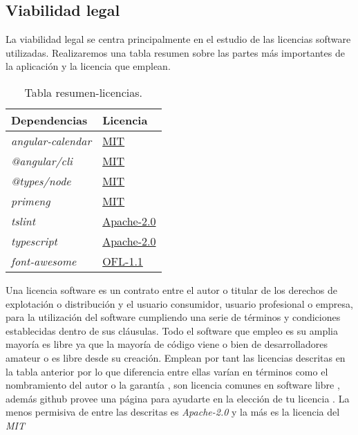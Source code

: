 \subsection{Viabilidad legal}\label{viabilidad-legal}
La viabilidad legal se centra principalmente en el estudio de las licencias software utilizadas. Realizaremos una tabla resumen sobre las partes más importantes de la aplicación y la licencia que emplean.

\begin{table}[htbp]
\begin{center}
\begin{tabular}{|l|l|}
\hline
Dependencias & Licencia \\
\hline \hline
\emph{angular-calendar} & \hyperlink{https://opensource.org/licenses/MIT}{MIT}\\ \hline
\emph{@angular/cli} & \hyperlink{https://opensource.org/licenses/MIT}{MIT}\\ \hline
\emph{@types/node} & \hyperlink{https://opensource.org/licenses/MIT}{MIT}\\ \hline
\emph{primeng} & \hyperlink{https://opensource.org/licenses/MIT}{MIT}\\ \hline
\emph{tslint} & \hyperlink{https://opensource.org/licenses/Apache-2.0}{Apache-2.0}\\ \hline
\emph{typescript} & \hyperlink{https://opensource.org/licenses/Apache-2.0}{Apache-2.0}\\ \hline
\emph{font-awesome} & \hyperlink{https://opensource.org/licenses/OFL-1.1}{OFL-1.1}\\ \hline

\end{tabular}
\caption{Tabla resumen-licencias.}
\label{tabla:licencias}
\end{center}
\end{table}


Una licencia software es un contrato entre el autor o titular de los derechos de explotación o distribución y el usuario consumidor, usuario profesional o empresa, para la utilización del software cumpliendo una serie de términos y condiciones establecidas dentro de sus cláusulas. Todo el software que empleo es su amplia mayoría es libre ya que la mayoría de código viene o bien de desarrolladores amateur o es libre desde su creación. Emplean por tant las licencias descritas en la tabla anterior por lo que diferencia entre ellas varían en términos como el nombramiento del autor o la garantía , son licencia comunes en software libre \cite{githublicense} , además github provee una página para ayudarte en la elección de tu licencia \citep{githubchoose}. La menos permisiva de entre las descritas es \emph{Apache-2.0} \cite{apache} y la más es la licencia del \emph{MIT} \citep{mit}

